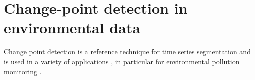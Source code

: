 \section{Change-point detection in environmental data}\label{chp:3:5}


Change point detection is a reference technique for time series segmentation and is used in a variety of applications \citep{basseville1993detection, chen2012parametric, liu2017change, reeves2007review, levy2009detection}, in particular for environmental pollution monitoring \citep{costa2016}. 


